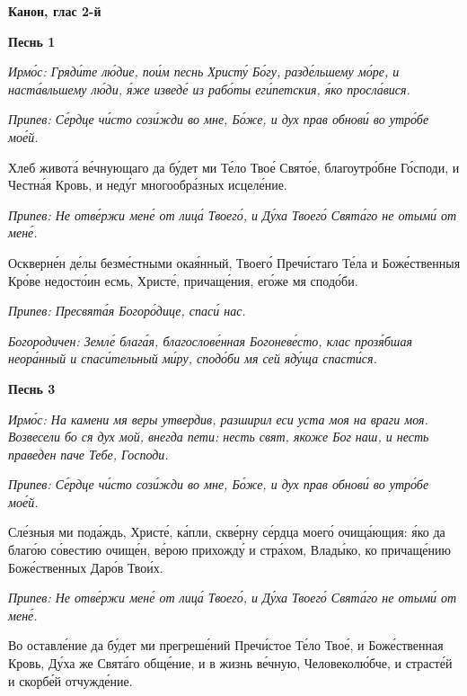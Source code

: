  

\bfseries Канон, глас 2-й\normalfont{}


 

\bfseries Песнь 1\normalfont{}


 \itshape Ирмо́с:\normalfont{} Гряди́те лю́дие, пои́м песнь Христу́ Бо́гу, разде́льшему мо́ре, и
наста́вльшему лю́ди, я́же изведе́ из рабо́ты еги́петския, я́ко просла́вися.


 \itshape Припев:\normalfont{} Се́рдце чи́сто сози́жди во мне, Бо́же, и дух прав обнови́ во утро́бе
мое́й.


   Хлеб живота́ ве́чнующаго да бу́дет ми Те́ло Твое́ Свято́е, благоутро́бне
Го́споди, и Честна́я Кровь, и неду́г многообра́зных исцеле́ние.


 \itshape Припев:\normalfont{} Не отве́ржи мене́ от лица́ Твоего́, и Ду́ха Твоего́ Свята́го не отыми́ от
мене́.


   Оскверне́н де́лы безме́стными окая́нный, Твоего́ Пречи́стаго Те́ла и
Боже́ственныя Кро́ве недосто́ин есмь, Христе́, причаще́ния, его́же мя
сподо́би.


 \itshape Припев:\normalfont{} Пресвята́я Богоро́дице, спаси́ нас.


 \itshape Богородичен:\normalfont{} Земле́ блага́я, благослове́нная Богоневе́сто, клас
прозя́бшая неора́нный и спаси́тельный ми́ру, сподо́би мя сей яду́ща
спасти́ся.



 

\bfseries Песнь 3\normalfont{}


 \itshape Ирмо́с:\normalfont{} На камени мя веры утвердив, разширил еси уста моя на враги моя.
Возвесели бо ся дух мой, внегда пети: несть свят, якоже Бог наш, и несть праведен
паче Тебе, Господи.


 \itshape Припев:\normalfont{} Се́рдце чи́сто сози́жди во мне, Бо́же, и дух прав обнови́ во утро́бе
мое́й.


   Сле́зныя ми пода́ждь, Христе́, ка́пли, скве́рну се́рдца моего́ очища́ющия:
я́ко да благо́ю со́вестию очище́н, ве́рою прихожду́ и стра́хом, Влады́ко, ко
причаще́нию Боже́ственных Даро́в Твои́х.


 \itshape Припев:\normalfont{} Не отве́ржи мене́ от лица́ Твоего́, и Ду́ха Твоего́ Свята́го не отыми́ от
мене́.


   Во оставле́ние да бу́дет ми прегреше́ний Пречи́стое Те́ло Твое́, и
Боже́ственная Кровь, Ду́ха же Свята́го обще́ние, и в жизнь ве́чную,
Человеколю́бче, и страсте́й и скорбе́й отчужде́ние.


